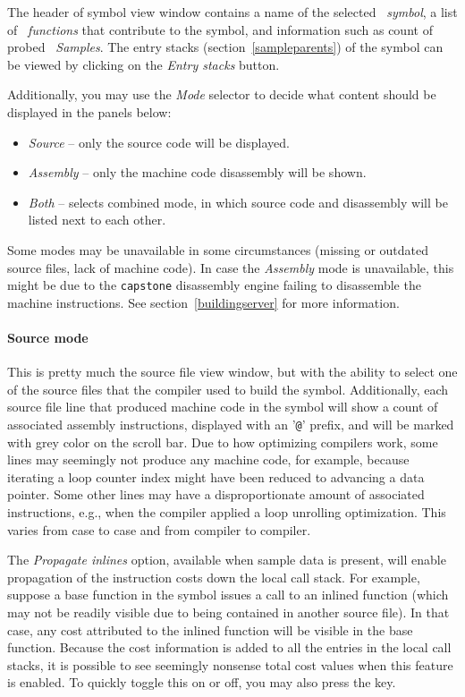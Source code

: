 \documentclass[hidelinks,titlepage,a4paper,twoside]{article}
\begin{document}
The header of symbol view window contains a name of the selected \emph{\faPuzzlePiece{}~symbol}, a list of \emph{\faSitemap{}~functions} that contribute to the symbol, and information such as count of probed \emph{\faEyeDropper{}~Samples}. The entry stacks (section~\ref{sampleparents}) of the symbol can be viewed by clicking on the \emph{Entry stacks} button.

Additionally, you may use the \emph{Mode} selector to decide what content should be displayed in the panels below:

\begin{itemize}
\item \emph{Source} -- only the source code will be displayed.
\item \emph{Assembly} -- only the machine code disassembly will be shown.
\item \emph{Both} -- selects combined mode, in which source code and disassembly will be listed next to each other.
\end{itemize}

Some modes may be unavailable in some circumstances (missing or outdated source files, lack of machine code). In case the \emph{Assembly} mode is unavailable, this might be due to the \texttt{capstone} disassembly engine failing to disassemble the machine instructions. See section~\ref{buildingserver} for more information.

\paragraph{Source mode}

This is pretty much the source file view window, but with the ability to select one of the source files that the compiler used to build the symbol. Additionally, each source file line that produced machine code in the symbol will show a count of associated assembly instructions, displayed with an '\texttt{@}' prefix, and will be marked with grey color on the scroll bar. Due to how optimizing compilers work, some lines may seemingly not produce any machine code, for example, because iterating a loop counter index might have been reduced to advancing a data pointer. Some other lines may have a disproportionate amount of associated instructions, e.g., when the compiler applied a loop unrolling optimization. This varies from case to case and from compiler to compiler.

The \emph{Propagate inlines} option, available when sample data is present, will enable propagation of the instruction costs down the local call stack. For example, suppose a base function in the symbol issues a call to an inlined function (which may not be readily visible due to being contained in another source file). In that case, any cost attributed to the inlined function will be visible in the base function. Because the cost information is added to all the entries in the local call stacks, it is possible to see seemingly nonsense total cost values when this feature is enabled. To quickly toggle this on or off, you may also press the  key.
\end{document}
